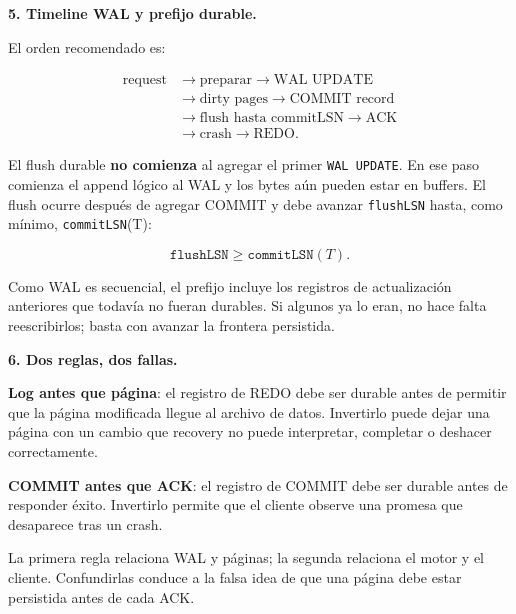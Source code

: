 \documentclass[variant=guiaresuelta,cover=institutional,mode=screen]{ua-engineering-v6-article}
\begin{document}
\begin{uaexercise}
\textbf{5. Timeline WAL y prefijo durable.}
\end{uaexercise}
\begin{uaanswer}
El orden recomendado es:

\[
\begin{aligned}
\text{request} &\rightarrow \text{preparar} \rightarrow \text{WAL UPDATE} \\
&\rightarrow \text{dirty pages} \rightarrow \text{COMMIT record} \\
&\rightarrow \text{flush hasta commitLSN} \rightarrow \text{ACK} \\
&\rightarrow \text{crash} \rightarrow \text{REDO}.
\end{aligned}
\]

El flush durable \textbf{no comienza} al agregar el primer \texttt{WAL UPDATE}. En ese paso comienza el append lógico al WAL y los bytes aún pueden estar en buffers. El flush ocurre después de agregar COMMIT y debe avanzar \texttt{flushLSN} hasta, como mínimo, \texttt{commitLSN}(T):

\[
\texttt{flushLSN} \geq \texttt{commitLSN}(T).
\]

Como WAL es secuencial, el prefijo incluye los registros de actualización anteriores que todavía no fueran durables. Si algunos ya lo eran, no hace falta reescribirlos; basta con avanzar la frontera persistida.
\end{uaanswer}

\begin{uaexercise}
\textbf{6. Dos reglas, dos fallas.}
\end{uaexercise}
\begin{uaanswer}
\textbf{Log antes que página}: el registro de REDO debe ser durable antes de permitir que la página modificada llegue al archivo de datos. Invertirlo puede dejar una página con un cambio que recovery no puede interpretar, completar o deshacer correctamente.

\textbf{COMMIT antes que ACK}: el registro de COMMIT debe ser durable antes de responder éxito. Invertirlo permite que el cliente observe una promesa que desaparece tras un crash.

La primera regla relaciona WAL y páginas; la segunda relaciona el motor y el cliente. Confundirlas conduce a la falsa idea de que una página debe estar persistida antes de cada ACK.
\end{uaanswer}
\end{document}
